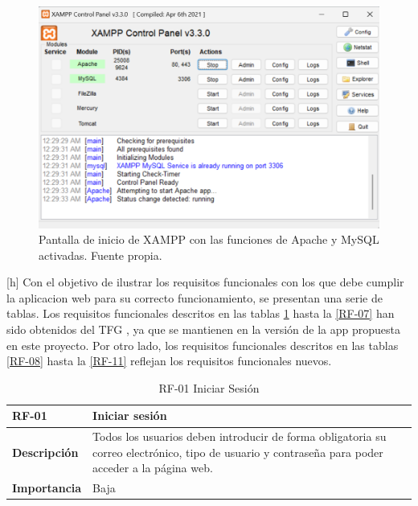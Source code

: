 \begin{figure}
    \centering
    \includegraphics[width=1\textwidth]{img/xamppactivar.png}
    \caption{Pantalla de inicio de XAMPP con las funciones de Apache y MySQL activadas. Fuente propia.}
    \label{fig:xamppactivar}
\end{figure}[h]
Con el objetivo de ilustrar los requisitos funcionales con los que debe cumplir la aplicacion web para su correcto funcionamiento, se presentan una serie de tablas. Los requisitos funcionales descritos en las tablas \ref{RF-01} hasta la \ref{RF-07} han sido obtenidos del TFG \cite{Martos2024}, ya que se mantienen en la versión de la app propuesta en este proyecto. Por otro lado, los requisitos funcionales descritos en las tablas \ref{RF-08} hasta la \ref{RF-11} reflejan los requisitos funcionales nuevos.
\begin{table}[p]
    \centering
    \begin{tabularx}{\linewidth}{ p{} p{} }
        \toprule
        \textbf{RF-01}    & \textbf{Iniciar sesión}\\
        \toprule
        \textbf{Descripción}              & Todos los usuarios deben introducir de forma obligatoria su correo electrónico, tipo de usuario y contraseña para poder acceder a la página web.   \\
        \textbf{Importancia}                & Baja \\
        \bottomrule
    \end{tabularx}
    \caption{RF-01 Iniciar Sesión \cite{Martos2024}}
    \label{RF-01}
\end{table}


